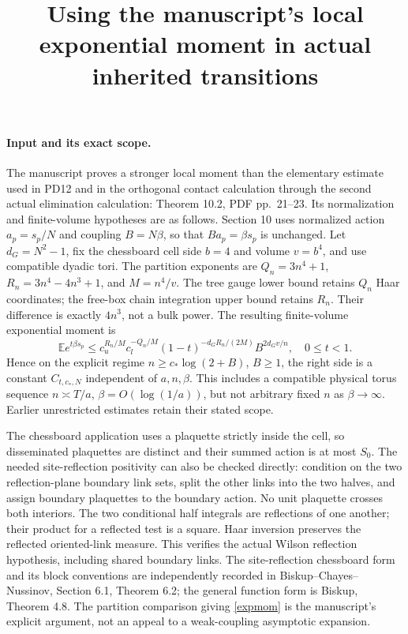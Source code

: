 \documentclass[11pt]{article}
\title{Using the manuscript's local exponential moment in actual inherited transitions}\author{}\date{}
\newcommand{\E}{\mathbb E}
\begin{document}
\maketitle
\paragraph{Input and its exact scope.}
The manuscript proves a stronger local moment than the elementary estimate used
in PD12 and in the orthogonal contact calculation through the second actual elimination calculation: Theorem 10.2, PDF pp.~21--23. Its normalization and finite-volume hypotheses are as follows.
Section 10 uses normalized action $a_p=s_p/N$ and coupling $B=N\beta$, so that
$Ba_p=\beta s_p$ is unchanged. Let $d_G=N^2-1$, fix the chessboard cell side $b=4$
and volume $v=b^4$, and use compatible dyadic tori. The partition exponents are
$Q_n=3n^4+1$, $R_n=3n^4-4n^3+1$, and $M=n^4/v$.
The tree gauge lower bound retains $Q_n$ Haar coordinates; the free-box chain integration
upper bound retains $R_n$. Their difference is exactly $4n^3$, not a bulk power.
The resulting finite-volume exponential moment is
\begin{equation}\label{expmom}
 \E e^{t\beta s_p}\le
 c_u^{R_n/M}c_l^{-Q_n/M}(1-t)^{-d_GR_n/(2M)}B^{2d_Gv/n},\quad 0\le t<1.
\end{equation}
Hence on the explicit regime $n\ge c_*\log(2+B)$, $B\ge1$, the right side is a constant
$C_{t,c_*,N}$ independent of $a,n,\beta$. This includes a compatible physical torus
sequence $n\asymp T/a$, $\beta=O(\log(1/a))$, but not arbitrary fixed $n$ as
$\beta\to\infty$. Earlier unrestricted estimates retain their stated scope.

The chessboard application uses a plaquette strictly inside the cell, so disseminated
plaquettes are distinct and their summed action is at most $S_0$. The needed site-reflection
positivity can also be checked directly: condition on the two reflection-plane boundary
link sets, split the other links into the two halves, and assign boundary plaquettes to
the boundary action. No unit plaquette crosses both interiors. The two conditional half
integrals are reflections of one another; their product for a reflected test is a square.
Haar inversion preserves the reflected oriented-link measure. This verifies the actual
Wilson reflection hypothesis, including shared boundary links.
The site-reflection chessboard form and its block conventions are independently recorded
in Biskup--Chayes--Nussinov, Section 6.1, Theorem 6.2; the general function form is
Biskup, Theorem 4.8. The partition comparison giving \eqref{expmom} is the manuscript's
explicit argument, not an appeal to a weak-coupling asymptotic expansion.
\end{document}
